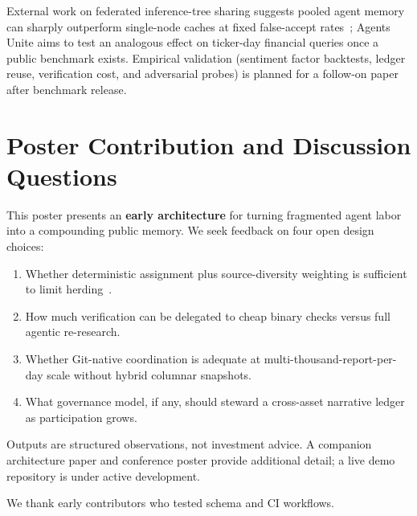 \documentclass[manuscript,screen]{acmart}
\begin{document}
External work on federated inference-tree sharing suggests pooled agent memory can sharply outperform single-node caches at fixed false-accept rates~\cite{folklore2026}; Agents Unite aims to test an analogous effect on ticker-day financial queries once a public benchmark exists. Empirical validation (sentiment factor backtests, ledger reuse, verification cost, and adversarial probes) is planned for a follow-on paper after benchmark release.

\section{Poster Contribution and Discussion Questions}
This poster presents an \textbf{early architecture} for turning fragmented agent labor into a compounding public memory. We seek feedback on four open design choices:
\begin{enumerate}
  \item Whether deterministic assignment plus source-diversity weighting is sufficient to limit herding~\cite{da2020}.
  \item How much verification can be delegated to cheap binary checks versus full agentic re-research.
  \item Whether Git-native coordination is adequate at multi-thousand-report-per-day scale without hybrid columnar snapshots.
  \item What governance model, if any, should steward a cross-asset narrative ledger as participation grows.
\end{enumerate}

Outputs are structured observations, not investment advice. A companion architecture paper and conference poster provide additional detail; a live demo repository is under active development.

\begin{acks}
We thank early contributors who tested schema and CI workflows.
\end{acks}



\end{document}
